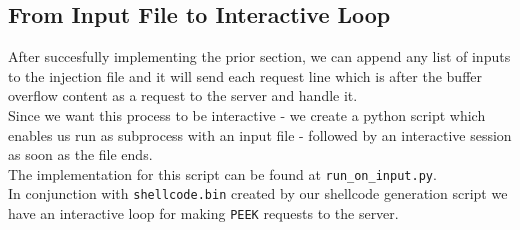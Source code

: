 \documentclass{article}
\begin{document}
\subsection{From Input File to Interactive Loop}
After succesfully implementing the prior section,
we can append any list of inputs to the injection file and it will
send each request line which is after the buffer overflow content
as a request to the server and handle it.\\

Since we want this process to be interactive - we create 
a python script which enables us run as subprocess
with an input file - followed by an interactive session 
as soon as the file ends.\\
The implementation for this script can be found at \texttt{run\_on\_input.py}.\\

In conjunction with \texttt{shellcode.bin} created by our shellcode generation script
we have an interactive loop for making \texttt{PEEK} requests to the server.
\end{document}
